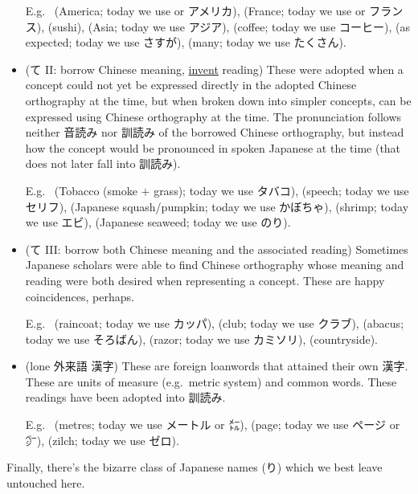 \documentclass[../nihongo-gakushuu-kyouzai.tex]{subfiles}
\begin{document}
\begin{itemize}
    E.g.\  (America; today we use  or アメリカ),  (France; today we use  or フランス),  (sushi),  (Asia; today we use アジア),  (coffee; today we use コーヒー),  (as expected; today we use さすが),  (many; today we use たくさん).

    \item (て II: borrow Chinese meaning, \ul{invent} reading) These were adopted when a concept could not yet be expressed directly in the adopted Chinese orthography at the time, but when broken down into simpler concepts, can be expressed using Chinese orthography at the time. The pronunciation follows neither 音読み nor 訓読み of the borrowed Chinese orthography, but instead how the concept would be pronounced in spoken Japanese at the time (that does not later fall into 訓読み).

    E.g.\  (Tobacco (smoke $+$ grass); today we use タバコ),  (speech; today we use セリフ),  (Japanese squash/pumpkin; today we use かぼちゃ),  (shrimp; today we use エビ),  (Japanese seaweed; today we use のり).

    \item (て III: borrow both Chinese meaning and the associated reading) Sometimes Japanese scholars were able to find Chinese orthography whose meaning and reading were both desired when representing a concept. These are happy coincidences, perhaps.

    E.g.\  (raincoat; today we use カッパ),  (club; today we use クラブ),  (abacus; today we use そろばん),  (razor; today we use カミソリ),  (countryside).


    \item (lone 外来語 漢字) These are foreign loanwords that attained their own 漢字. These are units of measure (e.g.\ metric system) and common words. These readings have been adopted into 訓読み.

    E.g.\  (metres; today we use メートル or ㍍),  (page; today we use ページ or ㌻),  (zilch; today we use ゼロ).
\end{itemize}

Finally, there's the bizarre class of Japanese names (り) which we best leave untouched here.
\end{document}
